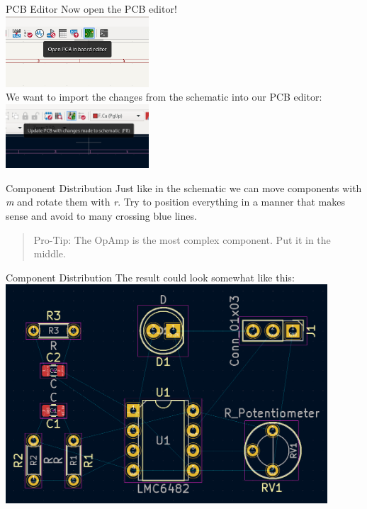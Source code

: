 \documentclass{beamer}
\begin{document}
\begin{frame}{PCB Editor}
  Now open the PCB editor!\\
  \includegraphics[width=0.4\textwidth]{images/open-pcb-editor.png}\\
  \pause
  We want to import the changes from the schematic into our PCB editor:\\
  \includegraphics[width=0.4\textwidth]{images/update-changes-from-schema.png}
\end{frame}

\begin{frame}{Component Distribution}
  Just like in the schematic we can move components with \textit{m} and rotate them with \textit{r}. Try to position everything in a manner that makes sense and avoid to many crossing blue lines.\\
  \vspace{2cm}
  \begin{quote}
    Pro-Tip: The OpAmp is the most complex component. Put it in the middle.
  \end{quote}
\end{frame}

\begin{frame}{Component Distribution}
  \centering
  The result could look somewhat like this:
  \includegraphics[width=0.9\textwidth]{images/distributed-components.png} 
\end{frame}
\end{document}
